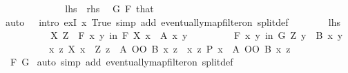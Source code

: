 \begin{isabellebody}
\ \ \ \ \isamarkupfalse%
\isanewline
\ \ \ \ \ \ \isamarkupfalse%
\ {\isacharquery}{\kern0pt}lhs\ \ {\isacharquery}{\kern0pt}rhs\ \isamarkupfalse%
\ G\ F\ that\isanewline
\ \ \ \ \ \ \ \ \isamarkupfalse%
{\isacharparenleft}{\kern0pt}auto\ {}\ {}\ intro{\isacharcolon}{\kern0pt}\ exI{\isacharbrackleft}{\kern0pt}\ x{\isacharequal}{\kern0pt}{\isachardoublequoteopen}{\isasymlambda}{\isacharunderscore}{\kern0pt}{\isachardot}{\kern0pt}\ True{\isachardoublequoteclose}{\isacharbrackright}{\kern0pt}\ simp\ add{\isacharcolon}{\kern0pt}\ eventually{\isacharunderscore}{\kern0pt}map{\isacharunderscore}{\kern0pt}filter{\isacharunderscore}{\kern0pt}on\ split{\isacharunderscore}{\kern0pt}def{\isacharparenright}{\kern0pt}\isanewline
\ \ \ \ \ \ \isamarkupfalse%
\ {\isacharquery}{\kern0pt}lhs\isanewline
\ \ \ \ \ \ \isamarkupfalse%
\ \isamarkupfalse%
\ X\ Z\ \ {\isachardoublequoteopen}{\isasymforall}\isactrlsub F\ {\isacharparenleft}{\kern0pt}x{\isacharcomma}{\kern0pt}\ y{\isacharparenright}{\kern0pt}\ in\ F{\isachardot}{\kern0pt}\ X\ x\ {\isasymand}\ A\ x\ y{\isachardoublequoteclose}\isanewline
\ \ \ \ \ \ \ \ \ {\isachardoublequoteopen}{\isasymforall}\isactrlsub F\ {\isacharparenleft}{\kern0pt}x{\isacharcomma}{\kern0pt}\ y{\isacharparenright}{\kern0pt}\ in\ G{\isachardot}{\kern0pt}\ Z\ y\ {\isasymand}\ B\ x\ y{\isachardoublequoteclose}\isanewline
\ \ \ \ \ \ \ \ \ {\isachardoublequoteopen}{\isacharparenleft}{\kern0pt}{\isasymlambda}{\isacharparenleft}{\kern0pt}x{\isacharcomma}{\kern0pt}\ z{\isacharparenright}{\kern0pt}{\isachardot}{\kern0pt}\ X\ x\ {\isasymand}\ Z\ z\ {\isasymand}\ {\isacharparenleft}{\kern0pt}A\ OO\ B{\isacharparenright}{\kern0pt}\ x\ z{\isacharparenright}{\kern0pt}\ {\isasymle}\ {\isacharparenleft}{\kern0pt}{\isasymlambda}{\isacharparenleft}{\kern0pt}x{\isacharcomma}{\kern0pt}\ z{\isacharparenright}{\kern0pt}{\isachardot}{\kern0pt}\ P\ x\ {\isasymand}\ {\isacharparenleft}{\kern0pt}A\ OO\ B{\isacharparenright}{\kern0pt}\ x\ z{\isacharparenright}{\kern0pt}{\isachardoublequoteclose}\isanewline
\ \ \ \ \ \ \ \ \isamarkupfalse%
\ F\ G\ \isamarkupfalse%
{\isacharparenleft}{\kern0pt}auto\ simp\ add{\isacharcolon}{\kern0pt}\ eventually{\isacharunderscore}{\kern0pt}map{\isacharunderscore}{\kern0pt}filter{\isacharunderscore}{\kern0pt}on\ split{\isacharunderscore}{\kern0pt}def{\isacharparenright}{\kern0pt}\isanewline

\end{isabellebody}
